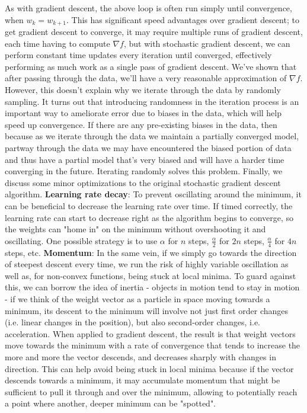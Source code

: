 \documentclass{article}
\begin{document}
As with gradient descent, the above loop is often run simply until convergence, when $ w_k = w_{k + 1} $. This has significant speed advantages over gradient descent; to get gradient descent to converge, it may require multiple runs of gradient descent, each time having to compute $ \nabla f $, but with stochastic gradient descent, we can perform constant time updates every iteration until converged, effectively performing as much work as a single pass of gradient descent.
\newline
We've shown that after passing through the data, we'll have a very reasonable approximation of $ \nabla f $. However, this doesn't explain why we iterate through the data by randomly sampling. It turns out that introducing randomness in the iteration process is an important way to ameliorate error due to biases in the data, which will help speed up convergence. If there are any pre-existing biases in the data, then because as we iterate through the data we maintain a partially converged model, partway through the data we may have encountered the biased portion of data and thus have a partial model that's very biased and will have a harder time converging in the future. Iterating randomly solves this problem.
\newline
Finally, we discuss some minor optimizations to the original stochastic gradient descent algorithm.
\newline \newline
\textbf{Learning rate decay}: To prevent oscillating around the minimum, it can be beneficial to decrease the learning rate over time. If timed correctly, the learning rate can start to decrease right as the algorithm begins to converge, so the weights can "home in" on the minimum without overshooting it and oscillating.
\newline
One possible strategy is to use $ \alpha $ for $ n $ steps, $ \frac{\alpha}{2} $ for $ 2 n $ steps, $ \frac{\alpha}{4} $ for $ 4 n $ steps, etc.
\newline \newline
\textbf{Momentum}: In the same vein, if we simply go towards the direction of steepest descent every time, we run the risk of highly variable oscillation as well as, for non-convex functions, being stuck at local minima. To guard against this, we can borrow the idea of inertia - objects in motion tend to stay in motion - if we think of the weight vector as a particle in space moving towards a minimum, its descent to the minimum will involve not just first order changes (i.e. linear changes in the position), but also second-order changes, i.e. acceleration. When applied to gradient descent, the result is that weight vectors move towards the minimum with a rate of convergence that tends to increase the more and more the vector descends, and decreases sharply with changes in direction. This can help avoid being stuck in local minima because if the vector descends towards a minimum, it may accumulate momentum that might be sufficient to pull it through and over the minimum, allowing to potentially reach a point where another, deeper minimum can be "spotted".
\end{document}
